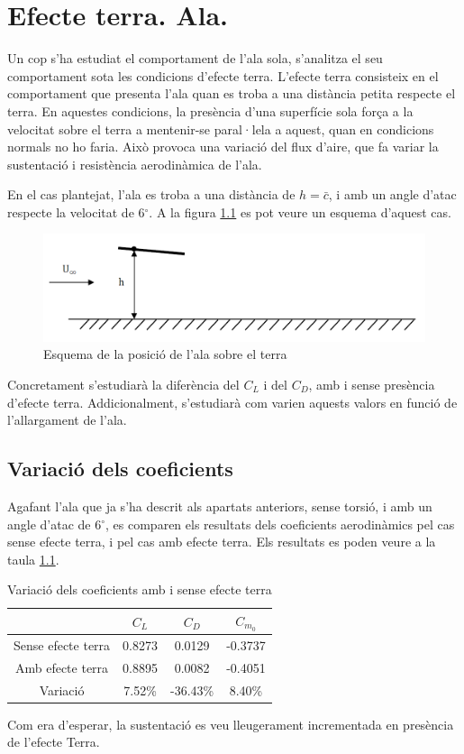 \chapter{Efecte terra. Ala.}
Un cop s'ha estudiat el comportament de l'ala sola, s'analitza el seu comportament sota les condicions d'efecte terra. L'efecte terra consisteix en el comportament que presenta l'ala quan es troba a una distància petita respecte el terra. En aquestes condicions, la presència d'una superfície sola força a la velocitat sobre el terra a mentenir-se paral·lela a aquest, quan en condicions normals no ho faria. Això provoca una variació del flux d'aire, que fa variar la sustentació i resistència aerodinàmica de l'ala.

En el cas plantejat, l'ala es troba a una distància de $h=\bar{c}$, i amb un angle d'atac respecte la velocitat de 6$^{\circ}$. A la figura \ref{GroundEffect} es pot veure un esquema d'aquest cas.

\begin{figure}[H]
	\centering
	\includegraphics[scale=0.5]{./plots/GroundEffectWing.png}
	\caption{Esquema de la posició de l'ala sobre el terra}
	\label{GroundEffect}
\end{figure}

Concretament s'estudiarà la diferència del $C_{L}$ i del $C_{D}$, amb i sense presència d'efecte terra. Addicionalment, s'estudiarà com varien aquests valors en funció de l'allargament de l'ala.

\section{Variació dels coeficients}

Agafant l'ala que ja s'ha descrit als apartats anteriors, sense torsió, i amb un angle d'atac de 6$^{\circ}$, es comparen els resultats dels coeficients aerodinàmics pel cas sense efecte terra, i pel cas amb efecte terra. Els resultats es poden veure a la taula \ref{NoGroundvsGround}.

\begin{table} [H]
	\centering
	\begin{tabular}{| c | c | c | c |}	
		\hline
		& $C_{L}$ & $C_{D}$ & $C_{m_{0}}$ \\
		\hline
		Sense efecte terra & 0.8273 & 0.0129 & -0.3737 \\
		\hline
		Amb efecte terra & 0.8895 & 0.0082 & -0.4051 \\
		\hline	
		Variació & 7.52\% & -36.43\% & 8.40\% \\
		\hline
	\end{tabular}
\caption{Variació dels coeficients amb i sense efecte terra} \label{NoGroundvsGround}
\end{table}
Com era d'esperar, la sustentació es veu lleugerament incrementada en presència de l'efecte Terra.
